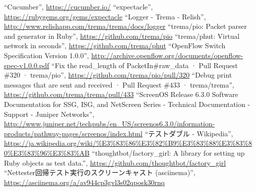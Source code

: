 \begin{thebibliography}{99}
         ``Cucumber'',
         \url{https://cucumber.io/}
         ``expectacle'',
         \url{https://rubygems.org/gems/expectacle}
         ``Logger - Trema - Relish'',
         \url{http://www.relishapp.com/trema/trema/docs/logger}
         ``trema/pio: Packet parser and generator in Ruby'',
         \url{https://github.com/trema/pio}
         ``trema/phut: Virtual network in seconds'',
         \url{https://github.com/trema/phut}
         ``OpenFlow Switch Specification Version 1.0.0'',
         \url{http://archive.openflow.org/documents/openflow-spec-v1.0.0.pdf}
  ``Fix the read\_length of PacketIn\#raw\_data ·
         Pull Request \#320 · trema/pio'',
         \url{https://github.com/trema/pio/pull/320}
  ``Debug print messages that are sent and received
         · Pull Request \#433 · trema/trema'',
         \url{https://github.com/trema/trema/pull/433}
  ``ScreenOS Release 6.3.0 Software
         Documentation for SSG, ISG, and NetScreen Series - Technical
         Documentation - Support - Juniper Networks'',
         \url{http://www.juniper.net/techpubs/en_US/screenos6.3.0/information-products/pathway-pages/screenos/index.html}
  ``テストダブル - Wikipedia'',
         \url{https://ja.wikipedia.org/wiki/%E3%83%86%E3%82%B9%E3%83%88%E3%83%80%E3%83%96%E3%83%AB}
  ``thoughtbot/factory\_girl: A library for setting
         up Ruby objects as test data.'',
         \url{https://github.com/thoughtbot/factory_girl}
         ``Nettester回帰テスト実行のスクリーンキャスト (asciinema)'', \url{https://asciinema.org/a/av944cp3gvl3s02qposk30rnq}
\end{thebibliography}

